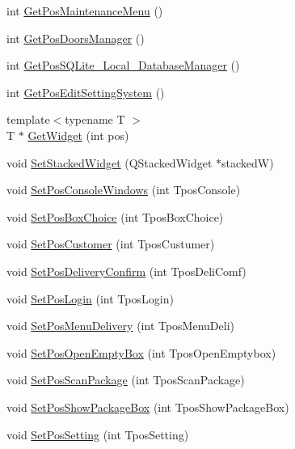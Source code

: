 \begin{DoxyCompactItemize}
\item 
int \hyperlink{class_show_widgets_aa29e84bd199c2eeef67195da624b8633}{Get\+Pos\+Maintenance\+Menu} ()
\item 
int \hyperlink{class_show_widgets_aa03adcf2f2140486f8c6b85e5c23e90a}{Get\+Pos\+Doors\+Manager} ()
\item 
int \hyperlink{class_show_widgets_a101605491e8ac96d7e4f13c47a5c9370}{Get\+Pos\+S\+Q\+Lite\+\_\+\+Local\+\_\+\+Database\+Manager} ()
\item 
int \hyperlink{class_show_widgets_a17dd995d69968828ed11b25e62aae6f9}{Get\+Pos\+Edit\+Setting\+System} ()
\item 
{\footnotesize template$<$typename T $>$ }\\T $\ast$ \hyperlink{class_show_widgets_ac7e1fd754e795f4caebe577443c31387}{Get\+Widget} (int pos)
\item 
void \hyperlink{class_show_widgets_aace00e3b059233ac9203cd937800c375}{Set\+Stacked\+Widget} (Q\+Stacked\+Widget $\ast$stacked\+W)
\item 
void \hyperlink{class_show_widgets_a24c6095f4d7ca399bbe5cf87bced29c7}{Set\+Pos\+Console\+Windows} (int Tpos\+Console)
\item 
void \hyperlink{class_show_widgets_a44da9f214435933f1c0471b643a12240}{Set\+Pos\+Box\+Choice} (int Tpos\+Box\+Choice)
\item 
void \hyperlink{class_show_widgets_a8f42677931d6e8e3f7c4f8565b59ff7e}{Set\+Pos\+Customer} (int Tpos\+Custumer)
\item 
void \hyperlink{class_show_widgets_a9896ce3d3785c60583afddf882d055dd}{Set\+Pos\+Delivery\+Confirm} (int Tpos\+Deli\+Comf)
\item 
void \hyperlink{class_show_widgets_ae4c92b7642cfe98b5cb643f1bf46e5ae}{Set\+Pos\+Login} (int Tpos\+Login)
\item 
void \hyperlink{class_show_widgets_a22237a4824334438a640a2fae169c528}{Set\+Pos\+Menu\+Delivery} (int Tpos\+Menu\+Deli)
\item 
void \hyperlink{class_show_widgets_ade749a1e2cb372cdc878a07ebbc32436}{Set\+Pos\+Open\+Empty\+Box} (int Tpos\+Open\+Emptybox)
\item 
void \hyperlink{class_show_widgets_ab45c6a1431201b74dc7a4755627cc7f6}{Set\+Pos\+Scan\+Package} (int Tpos\+Scan\+Package)
\item 
void \hyperlink{class_show_widgets_a7909e16b6e46794af9308a872a0aa154}{Set\+Pos\+Show\+Package\+Box} (int Tpos\+Show\+Package\+Box)
\item 
void \hyperlink{class_show_widgets_a42f6492791bee978e437ae948a9ade49}{Set\+Pos\+Setting} (int Tpos\+Setting)

\end{DoxyCompactItemize}
